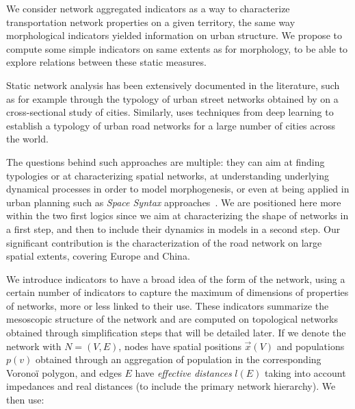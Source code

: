 We consider network aggregated indicators as a way to characterize transportation network properties on a given territory, the same way morphological indicators yielded information on urban structure. We propose to compute some simple indicators on same extents as for morphology, to be able to explore relations between these static measures.

Static network analysis has been extensively documented in the literature, such as for example through the typology of urban street networks obtained by \cite{louf2014typology} on a cross-sectional study of cities. Similarly, \cite{2017arXiv170902939M} uses techniques from deep learning to establish a typology of urban road networks for a large number of cities across the world.


The questions behind such approaches are multiple: they can aim at finding typologies or at characterizing spatial networks, at understanding underlying dynamical processes in order to model morphogenesis, or even at being applied in urban planning such as \emph{Space Syntax} approaches~\citep{hillier1989social}. We are positioned here more within the two first logics since we aim at characterizing the shape of networks in a first step, and then to include their dynamics in models in a second step. Our significant contribution is the characterization of the road network on large spatial extents, covering Europe and China.


We introduce indicators to have a broad idea of the form of the network, using a certain number of indicators to capture the maximum of dimensions of properties of networks, more or less linked to their use. These indicators summarize the mesoscopic structure of the network and are computed on topological networks obtained through simplification steps that will be detailed later. If we denote the network with $N=(V,E)$, nodes have spatial positions $\vec{x}(V)$ and populations $p(v)$ obtained through an aggregation of population in the corresponding Voronoï polygon, and edges $E$ have \emph{effective distances} $l(E)$ taking into account impedances and real distances (to include the primary network hierarchy). We then use:


